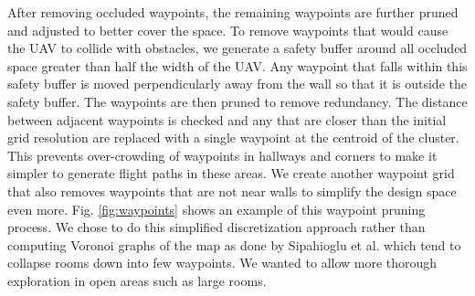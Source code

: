 \documentclass[letterpaper, 10 pt, conference]{ieeeconf}  %
\begin{document}
After removing occluded waypoints, the remaining waypoints are further pruned and adjusted to better cover the space. To remove waypoints that would cause the UAV to collide with obstacles, we generate a safety buffer around all occluded space greater than half the width of the UAV. Any waypoint that falls within this safety buffer is moved perpendicularly away from the wall so that it is outside the safety buffer. The waypoints are then pruned to remove redundancy. The distance between adjacent waypoints is checked and any that are closer than the initial grid resolution are replaced with a single waypoint at the centroid of the cluster. This prevents over-crowding of waypoints in hallways and corners to make it simpler to generate flight paths in these areas. We create another waypoint grid that also removes waypoints that are not near walls to simplify the design space even more. Fig. \ref{fig:waypoints} shows an example of this waypoint pruning process. We chose to do this simplified discretization approach rather than computing Voronoi graphs of the map as done by Sipahioglu et al. \cite{Sipahioglu2010} which tend to collapse rooms down into few waypoints. We wanted to allow more thorough exploration in open areas such as large rooms.
\end{document}
